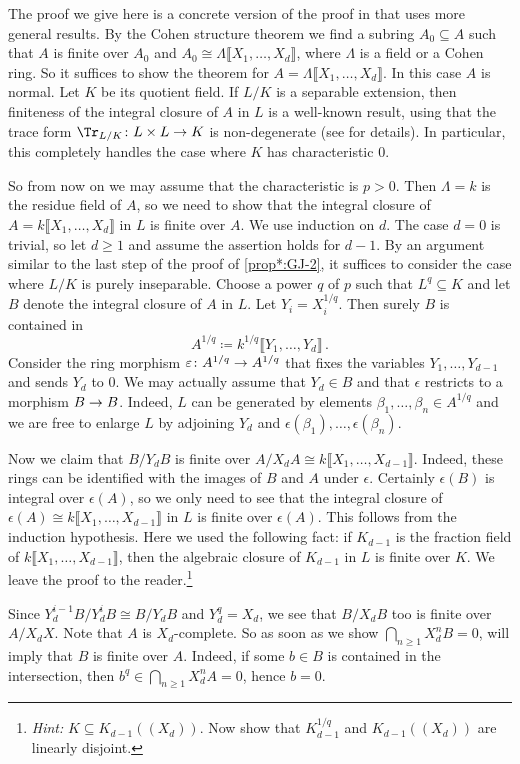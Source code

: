 \begin{proof*}
	The proof we give here is a concrete version of the proof in  that uses more general results. By the Cohen structure theorem we find a subring $A_0\subseteq A$ such that $A$ is finite over $A_0$ and $A_0\cong \Lambda\llbracket X_1,\dotsc,X_d\rrbracket$, where $\Lambda$ is a field or a Cohen ring. So it suffices to show the theorem for $A=\Lambda\llbracket X_1,\dotsc,X_d\rrbracket$. In this case $A$ is normal. Let $K$ be its quotient field. If $L/K$ is a separable extension, then finiteness of the integral closure of $A$ in $L$ is a well-known result, using that the trace form $\Tr_{L/K}\colon L\times L\morphism K$ is non-degenerate (see  for details). In particular, this completely handles the case where $K$ has characteristic $0$.
	
	So from now on we may assume that the characteristic is $p>0$. Then $\Lambda=k$ is the residue field of $A$, so we need to show that the integral closure of $A=k\llbracket X_1,\dotsc,X_d\rrbracket$ in $L$ is finite over $A$. We use induction on $d$. The case $d=0$ is trivial, so let $d\geq 1$ and assume the assertion holds for $d-1$. By an argument similar to the last step of the proof of \cref{prop*:GJ-2}, it suffices to consider the case where $L/K$ is purely inseparable. Choose a power $q$ of $p$ such that $L^q\subseteq K$ and let $B$ denote the integral closure of $A$ in $L$. Let $Y_i=X_i^{1/q}$. Then surely $B$ is contained in
	\begin{equation*}
	A^{1/q}\coloneqq k^{1/q}\llbracket Y_1,\dotsc,Y_d\rrbracket\,.
	\end{equation*}
	Consider the ring morphism $\epsilon\colon A^{1/q}\morphism A^{1/q}$ that fixes the variables $Y_1,\dotsc,Y_{d-1}$ and sends $Y_d$ to $0$. We may actually assume that $Y_d\in B$ and that $\epsilon$ restricts to a morphism $B\morphism B$. Indeed, $L$ can be generated by elements $\beta_1,\dotsc,\beta_n\in A^{1/q}$ and we are free to enlarge $L$ by adjoining $Y_d$ and $\epsilon(\beta_1),\dotsc,\epsilon(\beta_n)$.
	
	Now we claim that $B/Y_dB$ is finite over $A/X_dA\cong k\llbracket X_1,\dotsc,X_{d-1}\rrbracket$. Indeed, these rings can be identified with the images of $B$ and $A$ under $\epsilon$. Certainly $\epsilon(B)$ is integral over $\epsilon(A)$, so we only need to see that the integral closure of $\epsilon(A)\cong k\llbracket X_1,\dotsc,X_{d-1}\rrbracket$ in $L$ is finite over $\epsilon(A)$. This follows from the induction hypothesis. Here we used the following fact: if $K_{d-1}$ is the fraction field of $k\llbracket X_1,\dotsc,X_{d-1}\rrbracket$, then the algebraic closure of $K_{d-1}$ in $L$ is finite over $K$. We leave the proof to the reader.\footnote{\emph{Hint:} $K\subseteq K_{d-1}(\!(X_d)\!)$. Now show that $K_{d-1}^{1/q}$ and $K_{d-1}(\!(X_d)\!)$ are linearly disjoint.}
	
	Since $Y_d^{i-1}B/Y_d^iB\cong B/Y_dB$ and $Y_d^q=X_d$, we see that $B/X_dB$ too is finite over $A/X_dX$. Note that $A$ is $X_d$-complete. So as soon as we show $\bigcap_{n\geq 1}X_d^nB=0$,  will imply that $B$ is finite over $A$. Indeed, if some $b\in B$ is contained in the intersection, then $b^q\in \bigcap_{n\geq 1}X_d^nA=0$, hence $b=0$. 
\end{proof*}
